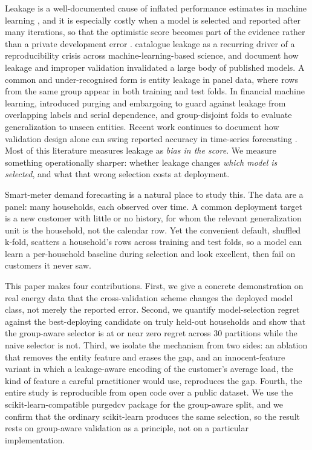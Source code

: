 \documentclass[forecasting,article,submit,oneauthor,pdftex]{Definitions/mdpi}
\newcommand{\pcv}{\textsf{purgedcv}}
\newcommand{\pkg}[1]{\textsf{#1}}
\DeclareRobustCommand{\code}[1]{\texttt{\detokenize{#1}}}
\begin{document}
Leakage is a well-documented cause of inflated performance estimates in machine
learning \citep{kaufman2012}, and it is especially costly when a model is
selected and reported after many iterations, so that the optimistic score
becomes part of the evidence rather than a private development error
\citep{mcdermott2021}. \citet{kapoor2023leakage} catalogue leakage as a
recurring driver of a reproducibility crisis across machine-learning-based
science, and \citet{roberts2021pitfalls} document how leakage and improper
validation invalidated a large body of published models. A common and
under-recognised form is entity leakage in panel data, where rows from the same
group appear in both training and test folds. In financial machine learning,
\citet{lopezdeprado2018afml} introduced purging and embargoing to guard against
leakage from overlapping labels and serial dependence, and group-disjoint folds
to evaluate generalization to unseen entities. Recent work continues to document
how validation design alone can swing reported accuracy in time-series
forecasting \citep{hiddenleaks2025}. Most of this literature measures leakage as
\emph{bias in the score}. We measure something operationally sharper: whether
leakage changes \emph{which model is selected}, and what that wrong selection
costs at deployment.

Smart-meter demand forecasting is a natural place to study this. The data are a
panel: many households, each observed over time. A common deployment target is a
new customer with little or no history, for whom the relevant generalization
unit is the household, not the calendar row. Yet the convenient default,
shuffled k-fold, scatters a household's rows across training and test folds, so
a model can learn a per-household baseline during selection and look excellent,
then fail on customers it never saw.

This paper makes four contributions. First, we give a concrete demonstration on
real energy data that the cross-validation scheme changes the deployed model
class, not merely the reported error. Second, we quantify model-selection regret
against the best-deploying candidate on truly held-out households and show that
the group-aware selector is at or near zero regret across 30 partitions while the
naive selector is not. Third, we isolate the mechanism from two sides: an
ablation that removes the entity feature and erases the gap, and an
innocent-feature variant in which a leakage-aware encoding of the customer's
average load, the kind of feature a careful practitioner would use, reproduces
the gap. Fourth, the entire study is reproducible from open code over a public
dataset. We use the \pkg{scikit-learn}-compatible \pcv{} package
\citep{purgedcv2026,pedregosa2011sklearn} for the group-aware split, and we
confirm that the ordinary \pkg{scikit-learn} \code{GroupKFold} produces the same
selection, so the result rests on group-aware validation as a principle, not on a
particular implementation.
\end{document}
